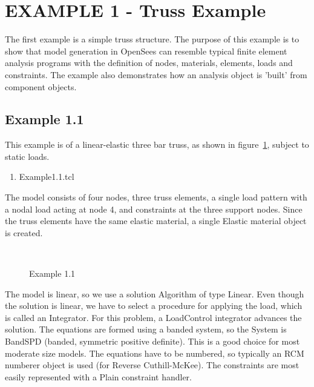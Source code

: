 \documentclass[12pt]{article}
\begin{document}
\pagebreak
\section {EXAMPLE 1 - Truss Example}

The first example is a simple truss structure. The purpose of
this example is to show that model generation in OpenSees can resemble
typical finite element analysis programs with the definition of nodes,
materials, elements, loads and constraints. The example also
demonstrates how an analysis object is 'built' from component objects.

\subsection{Example 1.1}
This example is of a linear-elastic three bar truss, as shown in
figure~\ref{example1}, subject to static loads.

\vspace{0.2in}  
\begin{enumerate} 
\item Example1.1.tcl
\end{enumerate}

\vspace{0.2in} 

The model consists of four nodes, 
three truss elements, a single load pattern
with a  nodal load acting at node 4, and constraints at the three 
support nodes.
Since the truss elements have the same elastic material, a
single Elastic material object is created.

\begin{figure}[h]
\begin{center}
\leavevmode
\hbox{%
\epsfxsize=3.5in
}
\end{center}
\caption{Example 1.1}
\label{example1}
\end{figure}

\vspace{0.2in}

The model is linear, so we use a solution Algorithm of type
Linear. Even though the solution is linear, we have to select a
procedure for applying the load, which is called an Integrator.
For this problem, 
a LoadControl integrator advances the solution.
The equations are formed using a banded system, so the System
is BandSPD (banded, symmetric positive definite).  This is a good
choice for most moderate size models.  The equations have to be
numbered, so typically an RCM numberer object is used (for Reverse
Cuthill-McKee). The constraints are most easily represented with a Plain
constraint handler.
\end{document}
